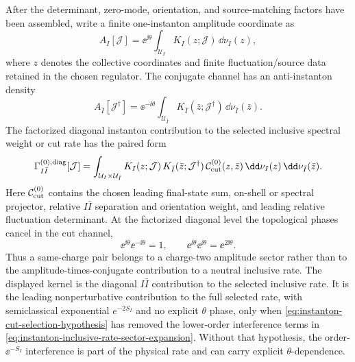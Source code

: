 \begin{controlledapproximation}
After the determinant, zero-mode, orientation, and source-matching factors
have been assembled, write a finite one-instanton amplitude coordinate as
\begin{equation}
  A_I[\mathcal J]
  =
  \ee^{\ii\theta}
  \int_{\mathcal U_I}
  K_I(z;\mathcal J)\,\dd\nu_I(z),
  \label{eq:instanton-one-amplitude-kernel-coordinate}
\end{equation}
where \(z\) denotes the collective coordinates and finite fluctuation/source
data retained in the chosen regulator.  The conjugate channel has an
anti-instanton density
\[
  A_{\bar I}[\mathcal J^\dagger]
  =
  \ee^{-\ii\theta}
  \int_{\mathcal U_{\bar I}}
  K_{\bar I}(\bar z;\mathcal J^\dagger)\,\dd\nu_{\bar I}(\bar z).
\]
The factorized diagonal instanton contribution to the selected inclusive
spectral weight or cut rate has the paired form
\begin{equation}
  \Gamma^{(0),{\rm diag}}_{I\bar I}[\mathcal J]
  =
  \int_{\mathcal U_I\times\mathcal U_{\bar I}}
  K_I(z;\mathcal J)\,
  K_{\bar I}(\bar z;\mathcal J^\dagger)\,
  \mathcal C_{\rm cut}^{(0)}(z,\bar z)\,
  \dd\nu_I(z)\,\dd\nu_{\bar I}(\bar z).
  \label{eq:instanton-cut-paired-rate-leading}
\end{equation}
Here \(\mathcal C_{\rm cut}^{(0)}\) contains the chosen leading final-state
sum, on-shell or spectral projector, relative \(I\bar I\) separation and
orientation weight, and leading relative fluctuation determinant.  At the
factorized diagonal level the topological phases cancel in the cut channel,
\[
  \ee^{\ii\theta}\ee^{-\ii\theta}=1,
  \qquad
  \ee^{\ii\theta}\ee^{\ii\theta}=\ee^{2\ii\theta}.
\]
Thus a same-charge pair belongs to a charge-two amplitude sector rather than
to the amplitude-times-conjugate contribution to a neutral inclusive rate.  The
displayed kernel is the diagonal \(I\bar I\) contribution to the selected
inclusive rate.  It is the leading nonperturbative contribution to the full
selected rate, with semiclassical exponential \(e^{-2S_I}\) and no explicit
\(\theta\) phase, only when
\eqref{eq:instanton-cut-selection-hypothesis} has removed the lower-order
interference terms in \eqref{eq:instanton-inclusive-rate-sector-expansion}.
Without that hypothesis, the order-\(\ee^{-S_I}\) interference is part of the
physical rate and can carry explicit \(\theta\)-dependence.


\end{controlledapproximation}
